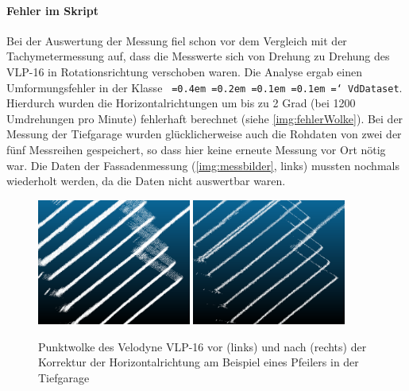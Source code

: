 \documentclass[a4paper,12pt,bibliography=totoc, listof=totoc,titlepage,pointlessnumbers]{scrreprt}
\newcommand*\justify{%
  \fontdimen2\font=0.4em%
  \fontdimen3\font=0.2em%
  \fontdimen4\font=0.1em%
  \fontdimen7\font=0.1em%
  \hyphenchar\font=`\-%
}
\newcommand{\code}[1]{\texttt{\justify{#1}}}
\begin{document}
\paragraph{Fehler im Skript} Bei der Auswertung der Messung  fiel schon vor dem Vergleich mit der Tachymetermessung auf, dass die Messwerte sich von Drehung zu Drehung des VLP-16 in Rotationsrichtung verschoben waren. Die Analyse ergab einen Umformungsfehler in der Klasse \code{VdDataset}. Hierdurch wurden die Horizontalrichtungen um bis zu 2 Grad (bei 1200 Umdrehungen pro Minute) fehlerhaft berechnet (siehe \autoref{img:fehlerWolke}). Bei der Messung der Tiefgarage wurden glücklicherweise auch die Rohdaten von zwei der fünf Messreihen gespeichert, so dass hier keine erneute Messung vor Ort nötig war. Die Daten der Fassadenmessung (\autoref{img:messbilder}, links) mussten nochmals wiederholt werden, da die Daten nicht auswertbar waren.

\begin{figure}
 \centering
 \includegraphics[width=0.45\textwidth]{./img/punktwolke_f.png}
 \includegraphics[width=0.45\textwidth]{./img/punktwolke_k.png}
 \caption{Punktwolke des Velodyne VLP-16 vor (links) und nach (rechts) der Korrektur der Horizontalrichtung am Beispiel eines Pfeilers in der Tiefgarage}
 \label{img:fehlerWolke}
\end{figure}
\end{document}

